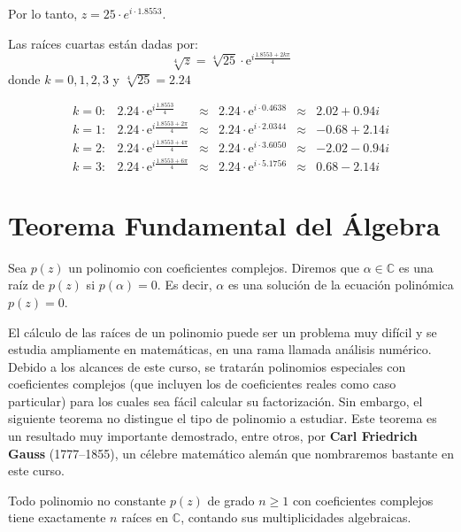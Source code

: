 \begin{prob}
\begin{myproof}
\begin{enumerate}[$a)$]
   Por lo tanto, $z = 25\cdot e^{i\cdot 1.8553}$.
   
   Las raíces cuartas están dadas por:
   $$\sqrt[4]{z} = \sqrt[4]{25}\cdot \mathrm{e}^{i\frac{1.8553+2k\pi}{4}}$$
   donde $k=0,1,2,3$ y $\sqrt[4]{25} = 2.24$
   
   $$\begin{matrix}
   k=0: & 2.24\cdot\mathrm{e}^{i\frac{1.8553}{4}} &\approx& 2.24\cdot\mathrm{e}^{i\cdot 0.4638} &\approx& 2.02+0.94i \\
   k=1: & 2.24\cdot\mathrm{e}^{i\frac{1.8553+2\pi}{4}} &\approx& 2.24\cdot\mathrm{e}^{i\cdot 2.0344} &\approx& -0.68+2.14i \\
   k=2: & 2.24\cdot\mathrm{e}^{i\frac{1.8553+4\pi}{4}} &\approx& 2.24\cdot\mathrm{e}^{i\cdot 3.6050} &\approx& -2.02-0.94i \\
   k=3: & 2.24\cdot\mathrm{e}^{i\frac{1.8553+6\pi}{4}} &\approx& 2.24\cdot\mathrm{e}^{i\cdot 5.1756} &\approx& 0.68-2.14i
   \end{matrix}$$
\end{enumerate}
\end{myproof}
\end{prob}

\section{Teorema Fundamental del Álgebra}

\begin{definition} 
Sea $p(z)$ un polinomio con coeficientes complejos. Diremos que $\alpha \in \mathbb{C}$ es una raíz de $p(z)$ si $p(\alpha)=0$. Es decir, $\alpha$ es una solución de la ecuación polinómica $p(z)=0$.
\end{definition}

El cálculo de las raíces de un polinomio puede ser un problema muy difícil y se estudia ampliamente en matemáticas, en una rama llamada análisis numérico. Debido a los alcances de este curso, se tratarán polinomios especiales con coeficientes complejos (que incluyen los de coeficientes reales como caso particular) para los cuales sea fácil calcular su factorización. Sin embargo, el siguiente teorema no distingue el tipo de polinomio a estudiar. Este teorema es un resultado muy importante demostrado, entre otros, por \textbf{Carl Friedrich Gauss} (1777--1855), un célebre matemático alemán que nombraremos bastante en este curso.

\begin{theorem}\label{tfam}
Todo polinomio no constante $p(z)$ de grado $n \geq 1$ con coeficientes complejos tiene exactamente $n$ raíces en $\mathbb{C}$, contando sus multiplicidades algebraicas.
\end{theorem}

